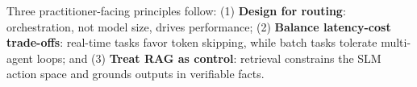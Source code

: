 Three practitioner-facing principles follow: (1) \textbf{Design for routing}: orchestration, not model size, drives performance; (2) \textbf{Balance latency-cost trade-offs}: real-time tasks favor token skipping, while batch tasks tolerate multi-agent loops; and (3) \textbf{Treat RAG as control}: retrieval constrains the SLM action space and grounds outputs in verifiable facts.
